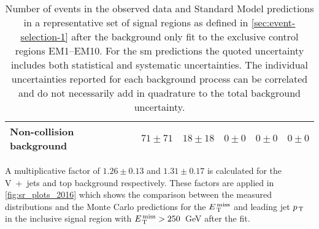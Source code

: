 \begin{table}[!htb]
{\begin{tabular}{lccccc}
    Non-collision background & $71 \pm 71$ & $18 \pm 18$ & $0 \pm 0$
                             & $0 \pm 0$ & $0 \pm 0$ \\
    \bottomrule
  \end{tabular}}
\caption{Number of events in the observed data and Standard Model predictions in
  a representative set of signal regions as defined in
  \cref{sec:event-selection-1} after the background only fit to the exclusive
  control regions EM1--EM10. For the \gls{sm} predictions the quoted uncertainty
  includes both statistical and systematic uncertainties. The individual
  uncertainties reported for each background process can be correlated and do
  not necessarily add in quadrature to the total background uncertainty.}
  \label{tab:results}
\end{table}
A multiplicative factor of $1.26 \pm 0.13$ and $1.31 \pm 0.17$ is calculated for
the V~+~jets and top background respectively. These factors are applied in
\cref{fig:sr_plots_2016}
which shows the comparison between the measured distributions and the Monte
Carlo predictions for the $E_\mathrm{\, T}^\mathrm{\, miss}$ and leading jet $p_\mathrm{\, T}$ in the inclusive signal
region with $E_\mathrm{\, T}^\mathrm{\, miss} > 250$~GeV after the fit.
